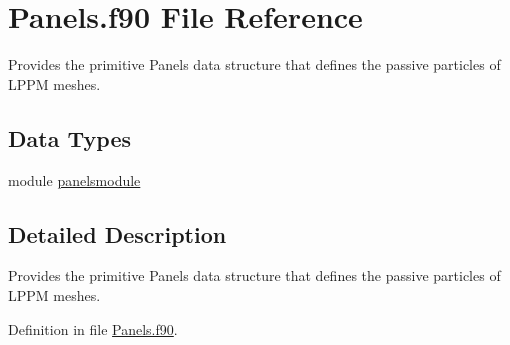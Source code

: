 \hypertarget{_panels_8f90}{\section{Panels.\+f90 File Reference}
\label{_panels_8f90}
}


Provides the primitive Panels data structure that defines the passive particles of L\+P\+P\+M meshes.  


\subsection*{Data Types}
\begin{DoxyCompactItemize}
\item 
module \hyperlink{classpanelsmodule}{panelsmodule}
\end{DoxyCompactItemize}


\subsection{Detailed Description}
Provides the primitive Panels data structure that defines the passive particles of L\+P\+P\+M meshes. 



Definition in file \hyperlink{_panels_8f90_source}{Panels.\+f90}.

